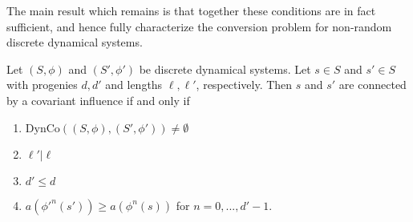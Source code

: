 The main result which remains is that together these conditions are in fact sufficient, and hence fully characterize the conversion problem for non-random discrete dynamical systems.


\begin{nthm}[label=thm:convProb]{\cite[Thm 14]{ScandGourSanders}}
    Let $(S,\phi)$ and $(S',\phi')$ be discrete dynamical systems. Let $s \in S$ and $s' \in S$ with progenies $d,d'$ and lengths $\ell,\ell'$, respectively. Then $s$ and $s'$ are connected by a covariant influence if and only if 
    \begin{enumerate}
        \item $\text{DynCo}((S,\phi),(S',\phi')) \neq \emptyset$
        \item $\ell'\vert \ell$
        \item $d' \leq d$
        \item $a({\phi'}^n(s')) \geq a(\phi^n(s))$ for $n = 0,...,d'-1$.
    \end{enumerate}
\end{nthm}
